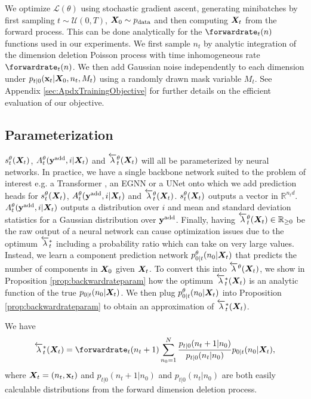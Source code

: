 We optimize $\mathcal{L}(\theta)$ using stochastic gradient ascent, generating minibatches by first sampling $t \sim \mathcal{U}(0, T)$, ${\bm{X}}_0 \sim p_{\rm{data}}$ and then computing ${\bm{X}}_t$ from  the forward process. This can be done analytically for the $\forwardrate_t(n)$ functions used in our experiments. We first sample $n_t$ by analytic integration of the dimension deletion Poisson process with time inhomogeneous rate $\forwardrate_t(n)$. We then add Gaussian noise independently to each dimension under $p_{t|0}({\mathbf{x}}_t | {\bm{X}}_0, n_t, M_t)$ using a randomly drawn mask variable $M_t$. See Appendix \ref{sec:ApdxTrainingObjective} for further details on the efficient evaluation of our objective.
\subsection{Parameterization}

$s_t^\theta({\bm{X}}_t)$, $A_t^\theta(\mathbf{y}^{\textup{add}}, i | {\bm{X}}_t)$ and $\overleftarrow{\lambda}_t^\theta({\bm{X}}_t)$ will all be parameterized by neural networks. In practice, we have a single backbone network suited to the problem of interest e.g. a Transformer \cite{vaswani2017attention}, an EGNN \cite{satorras2021n} or a UNet \cite{ronneberger2015u} onto which we add prediction heads for $s_t^\theta({\bm{X}}_t)$, $A_t^\theta(\mathbf{y}^{\textup{add}}, i | {\bm{X}}_t)$ and $\overleftarrow{\lambda}_t^\theta({\bm{X}}_t)$. $s_t^\theta({\bm{X}}_t)$ outputs a vector in $\mathbb{R}^{n_t d}$. $A_t^\theta(\mathbf{y}^{\textup{add}}, i | {\bm{X}}_t)$ outputs a distribution over $i$ and mean and standard deviation statistics for a Gaussian distribution over $\mathbf{y}^{\textup{add}}$. Finally, having $\overleftarrow{\lambda}_t^\theta({\bm{X}}_t) \in \mathbb{R}_{\geq 0}$ be the raw output of a neural network can cause optimization issues due to the optimum $\overleftarrow{\lambda}^*_t$ including a probability ratio which can take on very large values. Instead, we learn a component prediction network $p^\theta_{0|t}(n_0 | {\bm{X}}_t)$ that predicts the number of components in ${\bm{X}}_0$ given ${\bm{X}}_t$. To convert this into $\overleftarrow{\lambda}^\theta({\bm{X}}_t)$, we show in Proposition \ref{prop:backwardrateparam} how the optimum $\overleftarrow{\lambda}_t^*({\bm{X}}_t)$ is an analytic function of the true $p_{0|t}(n_0 | {\bm{X}}_t)$. We then plug $p^\theta_{0|t}(n_0 | {\bm{X}}_t)$ into Proposition \ref{prop:backwardrateparam} to obtain an approximation of $\overleftarrow{\lambda}_t^*({\bm{X}}_t)$.
\begin{proposition} We have
    \label{prop:backwardrateparam}
    \begin{equation}\label{eq:backwardrateparam}
        \backwardrate_{t}^*(\mX_t) = \forwardrate_{t}(n_t+1) \sum_{n_0=1}^N \frac{p_{t|0}(n_t + 1 | n_0)}{p_{t|0}(n_t | n_0)} p_{0|t}(n_0 | \mX_t),
    \end{equation}
    where ${\bm{X}}_t = (n_t, {\mathbf{x}}_t)$ and $p_{t|0}(n_t + 1 | n_0)$ and $p_{t|0}(n_t | n_0)$ are both easily calculable distributions from the forward dimension deletion process.
\end{proposition}



